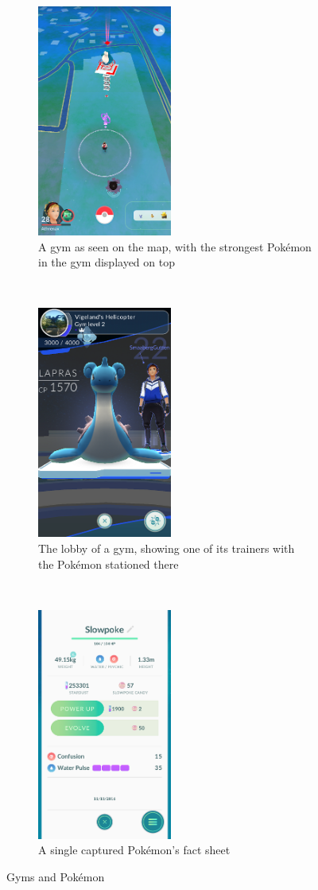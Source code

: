 \begin{figure}[h]
	\centering
	\begin{subfigure}[t]{0.3\textwidth}
		\centering
		\includegraphics[height=3in]{Figures/pogo-near-gym}
		\caption{A gym as seen on the map, with the strongest Pokémon in the gym displayed on top}
	\end{subfigure}
	~
	\begin{subfigure}[t]{0.3\textwidth}
		\centering
		\includegraphics[height=3in]{Figures/pogo-trainer-in-gym}
		\caption{The lobby of a gym, showing one of its trainers with the Pokémon stationed there}
	\end{subfigure}
	~
	\begin{subfigure}[t]{0.3\textwidth}
		\centering
		\includegraphics[height=3in]{Figures/pogo-moves-and-resources}
		\caption{A single captured Pokémon's fact sheet}
		\label{fig:pokemon-stats}
	\end{subfigure}
	\caption{Gyms and Pokémon}
\end{figure}

